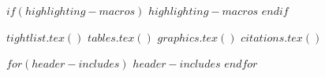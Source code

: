 
$if(highlighting-macros)$
  $highlighting-macros$
$endif$

$tightlist.tex()$
$tables.tex()$
$graphics.tex()$
$citations.tex()$

$for(header-includes)$
  $header-includes$
$endfor$
